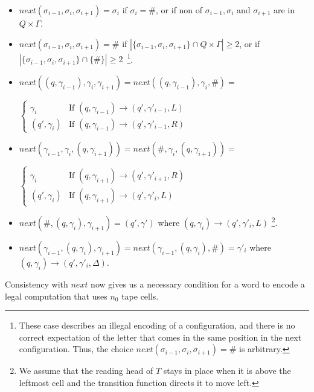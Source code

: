 \documentclass{lmcs}
\newcommand{\set}[1]{\{ #1 \}}
\begin{document}
\begin{itemize}
\item $next(\sigma_{i-1},\sigma_i,\sigma_{i+1})=\sigma_i$ if $\sigma_i=\#$, or if non of $\sigma_{i-1},\sigma_i$ and $\sigma_{i+1}$ are in $Q\times\Gamma$.
\item $next(\sigma_{i-1},\sigma_i,\sigma_{i+1})=\#$ if $|\set{\sigma_{i-1},\sigma_i,\sigma_{i+1}}\cap Q\times \Gamma|\geq 2$, or if $|\set{\sigma_{i-1},\sigma_i,\sigma_{i+1}}\cap \set{\#}|\geq 2$~\footnote{These case describes an illegal encoding of a configuration, and there is no correct expectation of the letter that comes in the same position in the next configuration. Thus, the choice $next(\sigma_{i-1},\sigma_i,\sigma_{i+1})=\#$ is arbitrary.}.
\item
$next((q,\gamma_{i-1}),\gamma_i,\gamma_{i+1})=
next((q,\gamma_{i-1}),\gamma_i,\#)=$
\begin{center}
$\left\{
\begin{array}{ll}
\gamma_i & \mbox{If $(q,\gamma_{i-1}) \rightarrow
(q',\gamma'_{i-1},L)$}\\
(q',\gamma_i) & \mbox{If $(q,\gamma_{i-1}) \rightarrow
(q',\gamma'_{i-1},R)$}
\end{array}
\right.$
\end{center}
\item
$next(\gamma_{i-1},\gamma_i,(q,\gamma_{i+1}))=
next(\#,\gamma_i,(q,\gamma_{i+1}))=$
\begin{center}
	$\left\{
	\begin{array}{ll}
		\gamma_i & \mbox{If $(q,\gamma_{i+1}) \rightarrow
			(q',\gamma'_{i+1},R)$}\\
		(q',\gamma_i) & \mbox{If $(q,\gamma_{i+1}) \rightarrow
			(q',\gamma'_{i},L)$}
	\end{array}
	\right.$
\end{center}
\item 
$next(\#,(q,\gamma_{i}),\gamma_{i+1})=(q',\gamma')$ where $(q,\gamma_{i}) \rightarrow (q',\gamma'_{i},L)$
\footnote{
	We assume that the reading head of $T$ stays in place when it is above the leftmost cell and the transition function directs it to move left.}.
\item
$next(\gamma_{i-1},(q,\gamma_{i}),\gamma_{i+1})=
next(\gamma_{i-1},(q,\gamma_{i}),\#)=
\gamma'_i$ where $(q,\gamma_{i}) \rightarrow (q',\gamma'_{i},\Delta)$.
\end{itemize}

\noindent
Consistency with $next$ now gives us a necessary condition for a word
to encode a legal computation that uses $n_0$ tape cells.  
\end{document}
